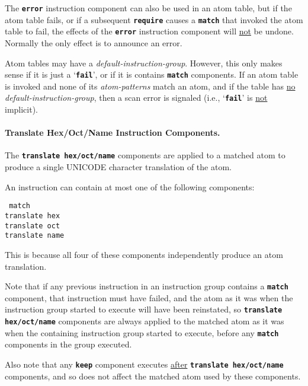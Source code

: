 \documentclass[12pt]{article}
\newcommand{\subsubsubsection}[1]{\paragraph[#1]{#1.}}
\newcommand{\TT}[1]{{\tt \bfseries #1}}
\newcommand{\EOL}{\penalty \exhyphenpenalty}
\begin{document}
The \TT{error} instruction component can also be used in an atom
table, but if the atom table fails, or if a subsequent \TT{require}
causes a \TT{match} that invoked the atom table to fail, the
effects of the \TT{error} instruction component will \underline{not}
be undone.  Normally the only effect is to announce an error.

Atom tables may have a {\em default-instruction-group}.
However, this only makes sense if it is just a `\TT{fail}', or
if it is contains \TT{match} components.  If an atom table
is invoked and none of its {\em atom-patterns} match an atom,
and if the table has \underline{no} {\em default-instruction-group},
then a scan error is signaled (i.e., `\TT{fail}' is \underline{not}
implicit).

\subsubsubsection{Translate Hex/Oct/Name Instruction Components}

The \TT{translate hex/\EOL oct/\EOL name} components are applied to a matched
atom to produce a single UNICODE character translation of the atom.

An instruction can contain at most one of the following components:
\begin{center}
\tt
match \\
translate hex \\
translate oct \\
translate name
\end{center}
This is because all four of these components independently produce
an atom translation.

Note that if any previous instruction in an instruction group contains
a \TT{match} component, that instruction must have failed, and the
atom as it was when the instruction group started to execute will have
been reinstated, so \TT{translate hex/oct/name} components are always
applied to the matched atom as it was when the containing instruction
group started to execute, before any \TT{match} components in the
group executed.

Also note that any \TT{keep} component executes \underline{after}
\TT{translate hex/oct/name} components, and so does not affect the
matched atom used by these components.
\end{document}

